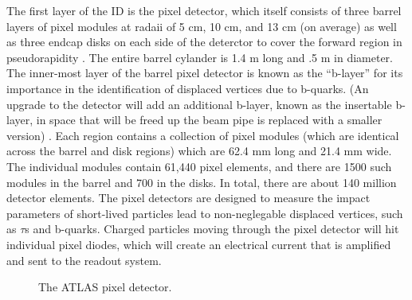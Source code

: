 The first layer of the ID is the pixel detector, which itself consists of three barrel layers of pixel modules at radaii of 5 cm, 10 cm, and 13 cm (on average) as well as three endcap disks on each side of the deterctor to cover the forward region in pseudorapidity \cite{PIXEL_DETECTOR}.
The entire barrel cylander is 1.4 m long and .5 m in diameter.
The inner-most layer of the barrel pixel detector is known as the ``b-layer'' for its importance in the identification of displaced vertices due to b-quarks.
(An upgrade to the detector will add an additional b-layer, known as the insertable b-layer, in space that will be freed up the beam pipe is replaced with a smaller version) \cite{INSERTABLE_B_LAYER}.
Each region contains a collection of pixel modules (which are identical across the barrel and disk regions) which are 62.4 mm long and 21.4 mm wide.
The individual modules contain 61,440 pixel elements, and there are 1500 such modules in the barrel and 700 in the disks. %
In total, there are about 140 million detector elements. %
The pixel detectors are designed to measure the impact parameters of short-lived particles lead to non-neglegable displaced vertices, such as $\tau$s and b-quarks.
Charged particles moving through the pixel detector will hit individual pixel diodes, which will create an electrical current that is amplified and sent to the readout system.


\begin{figure}
  \begin{center}
  \end{center}
  \caption{The ATLAS pixel detector.}
  \label{img:PixelDetector}
\end{figure}




